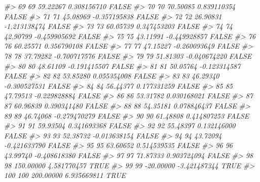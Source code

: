 \documentclass[
  oneside]{book}
\newenvironment{Shaded}{\begin{snugshade}}{\end{snugshade}}
\newcommand{\CommentTok}[1]{\textcolor[rgb]{0.56,0.35,0.01}{\textit{#1}}}
\begin{document}
\begin{Shaded}
\begin{Highlighting}[]
\CommentTok{\#\textgreater{} 69   69  59.22267  0.308156710     FALSE}
\CommentTok{\#\textgreater{} 70   70  70.50085  0.839110354     FALSE}
\CommentTok{\#\textgreater{} 71   71  45.08969 {-}0.357195838     FALSE}
\CommentTok{\#\textgreater{} 72   72  26.90831 {-}1.213138474     FALSE}
\CommentTok{\#\textgreater{} 73   73  60.05739  0.347453203     FALSE}
\CommentTok{\#\textgreater{} 74   74  42.90799 {-}0.459905692     FALSE}
\CommentTok{\#\textgreater{} 75   75  43.11991 {-}0.449928857     FALSE}
\CommentTok{\#\textgreater{} 76   76  60.25571  0.356790108     FALSE}
\CommentTok{\#\textgreater{} 77   77  47.15227 {-}0.260093649     FALSE}
\CommentTok{\#\textgreater{} 78   78  37.79282 {-}0.700717576     FALSE}
\CommentTok{\#\textgreater{} 79   79  51.81303 {-}0.040674220     FALSE}
\CommentTok{\#\textgreater{} 80   80  48.61109 {-}0.191415507     FALSE}
\CommentTok{\#\textgreater{} 81   81  50.05764 {-}0.123314587     FALSE}
\CommentTok{\#\textgreater{} 82   82  53.85280  0.055354008     FALSE}
\CommentTok{\#\textgreater{} 83   83  46.29340 {-}0.300527531     FALSE}
\CommentTok{\#\textgreater{} 84   84  56.44377  0.177331259     FALSE}
\CommentTok{\#\textgreater{} 85   85  47.79513 {-}0.229828884     FALSE}
\CommentTok{\#\textgreater{} 86   86  53.31782  0.030168021     FALSE}
\CommentTok{\#\textgreater{} 87   87  60.96839  0.390341480     FALSE}
\CommentTok{\#\textgreater{} 88   88  54.35181  0.078846437     FALSE}
\CommentTok{\#\textgreater{} 89   89  46.74068 {-}0.279470279     FALSE}
\CommentTok{\#\textgreater{} 90   90  61.48808  0.414807253     FALSE}
\CommentTok{\#\textgreater{} 91   91  59.93504  0.341693368     FALSE}
\CommentTok{\#\textgreater{} 92   92  55.48397  0.132146000     FALSE}
\CommentTok{\#\textgreater{} 93   93  52.38732 {-}0.013638154     FALSE}
\CommentTok{\#\textgreater{} 94   94  43.72094 {-}0.421633790     FALSE}
\CommentTok{\#\textgreater{} 95   95  63.60652  0.514539535     FALSE}
\CommentTok{\#\textgreater{} 96   96  43.99740 {-}0.408618380     FALSE}
\CommentTok{\#\textgreater{} 97   97  71.87333  0.903724094     FALSE}
\CommentTok{\#\textgreater{} 98   98 150.00000  4.581770457      TRUE}
\CommentTok{\#\textgreater{} 99   99 {-}20.00000 {-}3.421487344      TRUE}
\CommentTok{\#\textgreater{} 100 100 200.00000  6.935669811      TRUE}
\end{Highlighting}
\end{Shaded}
\end{document}
